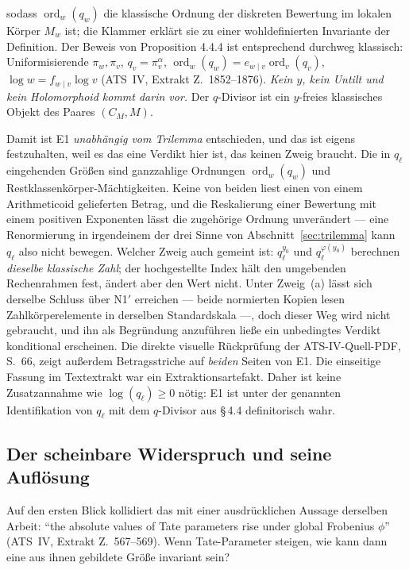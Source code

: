 \documentclass[11pt,a4paper]{article}
\theoremstyle{definition}
\theoremstyle{plain}
\theoremstyle{definition}
\newcommand{\ordd}{\operatorname{ord}}
\newcommand{\anchor}[2]{(#1, Extrakt Z.~#2)}
\begin{document}
sodass $\ordd_w(q_w)$ die klassische Ordnung der diskreten Bewertung im lokalen
Körper $M_w$ ist; die Klammer erklärt sie zu einer wohldefinierten Invariante der
Definition. Der Beweis von Proposition 4.4.4 ist entsprechend durchweg klassisch:
Uniformisierende $\pi_w, \pi_v$, $q_v = \pi_v^\alpha$,
$\ordd_w(q_w) = e_{w\mid v}\ordd_v(q_v)$, $\log w = f_{w\mid v}\log v$
\anchor{ATS~IV}{1852--1876}. \emph{Kein $y$, kein Untilt und kein Holomorphoid kommt
darin vor.} Der $q$-Divisor ist ein $y$-freies klassisches Objekt des Paares
$(C_M, M)$.

Damit ist E1 \emph{unabhängig vom Trilemma} entschieden, und das ist eigens
festzuhalten, weil es das eine Verdikt hier ist, das keinen Zweig braucht. Die in
$q_\ell$ eingehenden Größen sind ganzzahlige Ordnungen $\ordd_w(q_w)$ und
Restklassenkörper-Mächtigkeiten. Keine von beiden liest einen von einem
Arithmeticoid gelieferten Betrag, und die Reskalierung einer Bewertung mit einem
positiven Exponenten lässt die zugehörige Ordnung unverändert --- eine
Renormierung in irgendeinem der drei Sinne von Abschnitt~\ref{sec:trilemma} kann
$q_\ell$ also nicht bewegen. Welcher Zweig auch gemeint ist:
$q_\ell^{y_0}$ und $q_\ell^{\varphi(y_0)}$ berechnen \emph{dieselbe klassische
Zahl}; der hochgestellte Index hält den umgebenden Rechenrahmen fest, ändert aber
den Wert nicht. Unter Zweig~(a) lässt sich derselbe Schluss über N1$'$ erreichen
--- beide normierten Kopien lesen Zahlkörperelemente in derselben Standardskala
---, doch dieser Weg wird nicht gebraucht, und ihn als Begründung anzuführen ließe
ein unbedingtes Verdikt konditional erscheinen. Die direkte visuelle Rückprüfung
der ATS-IV-Quell-PDF, S.~66, zeigt außerdem Betragsstriche auf \emph{beiden} Seiten
von E1. Die einseitige Fassung im Textextrakt war ein Extraktionsartefakt. Daher
ist keine Zusatzannahme wie $\log(q_\ell)\ge 0$ nötig: E1 ist unter der genannten
Identifikation von $q_\ell$ mit dem $q$-Divisor aus \S\,4.4 definitorisch wahr.

\subsection{Der scheinbare Widerspruch und seine Auflösung}

Auf den ersten Blick kollidiert das mit einer ausdrücklichen Aussage derselben
Arbeit: ``the absolute values of Tate parameters rise under global Frobenius
$\phi$'' \anchor{ATS~IV}{567--569}. Wenn Tate-Parameter steigen, wie kann dann eine
aus ihnen gebildete Größe invariant sein?
\end{document}
